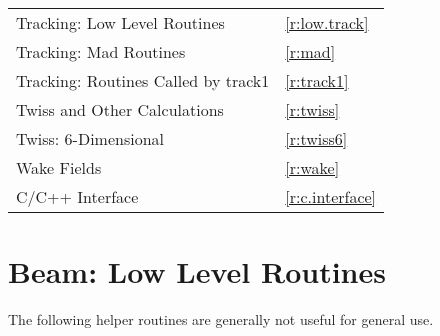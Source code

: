 \begin{center}
\begin{tabular}{ll}
  Tracking: Low Level Routines                & \ref{r:low.track}      \\
  Tracking: Mad Routines                      & \ref{r:mad}            \\
  Tracking: Routines Called by track1         & \ref{r:track1}         \\
  Twiss and Other Calculations                & \ref{r:twiss}          \\
  Twiss: 6-Dimensional                        & \ref{r:twiss6}         \\
  Wake Fields                                 & \ref{r:wake}           \\
  C/C++ Interface                             & \ref{r:c.interface}    \\
\end{tabular}
\end{center}
\toffset

\section{Beam: Low Level Routines}
\label{r:low.beam}

The following helper routines are generally not useful for general use.

